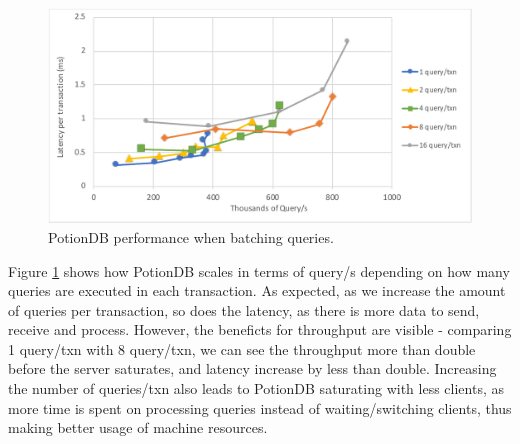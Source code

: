 \documentclass{vldb}
\newcommand{\grumbler}[2]{{\color{red}{\bf #1:} #2}}
\newcommand{\andre}[1]{\grumbler{andre}{#1}}
\begin{document}

\begin{figure}
	\centering
	\includegraphics[width=.95\linewidth]{ops_per_txn_few_cut}
	\caption{PotionDB performance when batching queries. %
	}
	\label{fig:ops_per_txn}
\end{figure}


Figure \ref{fig:ops_per_txn} shows how PotionDB scales in terms of query/s depending on how many queries are executed in each transaction.
As expected, as we increase the amount of queries per transaction, so does the latency, as there is more data to send, receive and process.
However, the beneficts for throughput are visible - comparing 1 query/txn with 8 query/txn, we can see the throughput more than double before the server saturates, and latency increase by less than double.
Increasing the number of queries/txn also leads to PotionDB saturating with less clients, as more time is spent on processing queries instead of waiting/switching clients, thus making better usage of machine resources.
\end{document}
